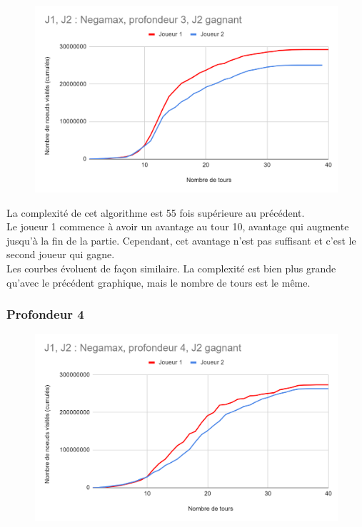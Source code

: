 \documentclass[12pt]{article}
\begin{document}
\begin{figure}[!h]
   \includegraphics[width=\textwidth]{prof3negamax.png}
\end{figure}

La complexité de cet algorithme est 55 fois supérieure au précédent.\\
Le joueur 1 commence à avoir un avantage au tour 10, avantage qui augmente jusqu’à la fin de la partie. Cependant, cet avantage n’est pas suffisant et c’est le second joueur qui gagne.\\

Les courbes évoluent de façon similaire.
La complexité est bien plus grande qu'avec le précédent graphique, mais le nombre de tours est le même.

\newpage
\subsubsection{Profondeur 4}

\begin{figure}[!h]
   \includegraphics[width=\textwidth]{prof4negamax.png}
\end{figure}
\end{document}
